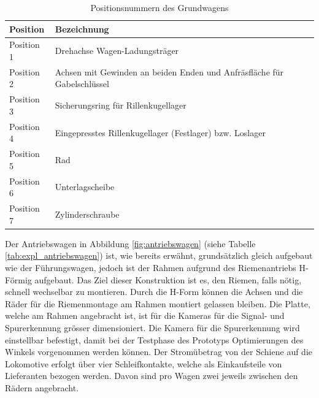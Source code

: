 \documentclass[../../main.tex]{subfiles}
\begin{document}
    \begin{table}[H] \centering
        \begin{tabular}{|l|l|}
        \hline
        \textbf{Position} & \textbf{Bezeichnung}\\
        \hline
        Position 1          & Drehachse Wagen-Ladungsträger\\
         \hline
        Position 2          & Achsen mit Gewinden an beiden Enden und Anfräsfläche für Gabelschlüssel\\
         \hline
        Position 3          & Sicherungsring für Rillenkugellager\\
        \hline
        Position 4          & Eingepresstes Rillenkugellager (Festlager) bzw. Loslager\\
        \hline
        Position 5          & Rad\\
        \hline
        Position 6          & Unterlagscheibe\\
        \hline
        Position 7          & Zylinderschraube\\
        \hline
        \end{tabular}

        \caption{Positionsnummern des Grundwagens}
        \label{tab:expl_fuehrungswagen}
        \end{table}
    \newpage

    Der Antriebswagen in Abbildung \ref{fig:antriebswagen} (siehe Tabelle \ref{tab:expl_antriebswagen}) ist, wie bereits erwähnt, grundsätzlich gleich aufgebaut wie der Führungswagen, jedoch ist der Rahmen aufgrund des Riemenantriebs H-Förmig aufgebaut. Das Ziel dieser Konstruktion ist es, den Riemen, falls nötig, schnell wechselbar zu montieren. Durch die H-Form können die Achsen und die Räder für die Riemenmontage am Rahmen montiert gelassen bleiben. Die Platte, welche am Rahmen angebracht ist, ist für die Kameras für die Signal- und Spurerkennung grösser dimensioniert. Die Kamera für die Spurerkennung wird einstellbar befestigt, damit bei der Testphase des Prototyps Optimierungen des Winkels vorgenommen werden können. Der Stromübetrag von der Schiene auf die Lokomotive erfolgt über vier Schleifkontakte, welche als Einkaufsteile von Lieferanten bezogen werden. Davon sind pro Wagen zwei jeweils zwischen den Rädern angebracht.\\
\end{document}
